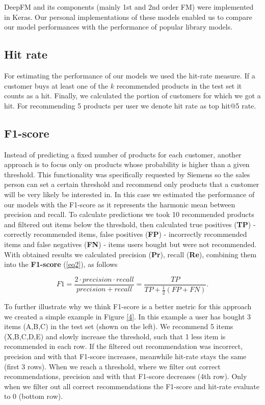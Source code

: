 \documentclass[fleqn,moreauthors,10pt]{ds_report}
\begin{document}
DeepFM and its components (mainly 1st and 2nd order FM) were implemented in Keras.
Our personal implementations of these models enabled us to compare our model performances with the performance of popular library models.

\subsection*{Hit rate}
For estimating the performance of our models we used the hit-rate measure. If a customer buys at least one of the $k$ recommended products in the test set it counts as a hit. Finally, we calculated the portion of customers for which we got a hit. For recommending 5 products per user we denote hit rate as top hit@5 rate.

\subsection*{F1-score}
Instead of predicting a fixed number of products for each customer, another approach is to focus only on products whose probability is higher than a given threshold. This functionality was specifically requested by Siemens so the sales person can set a certain threshold and recommend only products that a customer will be very likely be interested in. In this case we estimated the performance of our models with the F1-score as it represents the harmonic mean between precision and recall. To calculate predictions we took 10 recommended products and filtered out items below the threshold, then calculated true positives (\textbf{TP}) - correctly recommended items, false positives (\textbf{FP}) - incorrectly recommended items and false negatives (\textbf{FN}) - items users bought but were not recommended. With obtained results we calculated precision (\textbf{Pr}), recall (\textbf{Re}), combining them into the \textbf{F1-score} (\ref{eq2}), as follows


\begin{equation}
	 F1 = \frac{2 \cdot precision \cdot recall}{precision + recall} = \frac{TP}{TP + \frac{1}{2}(FP + FN)}.
	\label{eq2}
\end{equation}

\noindent To further illustrate why we think F1-score is a better metric for this approach we created a simple example in Figure \ref{4}. In this example a user has bought 3 items (A,B,C) in the test set (shown on the left). We recommend 5 items (X,B,C,D,E) and slowly increase the threshold, such that 1 less item is recommended in each row. If the filtered out recommendation was incorrect, precision and with that F1-score increases, meanwhile hit-rate stays the same (first 3 rows). When we reach a threshold, where we filter out correct recommendations, precision and with that F1-score decreases (4th row). Only when we filter out all correct recommendations the F1-score and hit-rate evaluate to 0 (bottom row).
\end{document}
